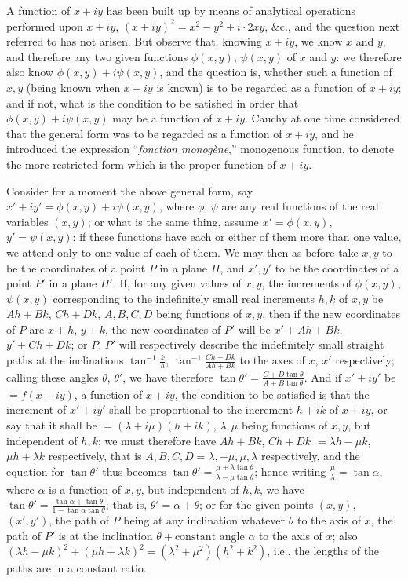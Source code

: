 \documentclass[11pt,a4paper]{book}
\begin{document}
A function of $x + iy$ has been built up by means of analytical operations performed upon $x + iy$, $(x + iy)^{2} = x^{2} - y^{2} + i \cdot 2xy$, \&c., and the question next referred to has not arisen. But observe that, knowing $x + iy$, we know $x$ and $y$, and therefore any two given functions $\phi(x, y)$, $\psi(x, y)$ of $x$ and $y$: we therefore also know $\phi(x, y) + i\psi(x, y)$, and the question is, whether such a function of $x, y$ (being known when $x + iy$ is known) is to be regarded as a function of $x + iy$; and if not, what is the condition to be satisfied in order that $\phi(x, y) + i\psi(x, y)$ may be a function of $x + iy$. Cauchy at one time considered that the general form was to be regarded as a function of $x + iy$, and he introduced the expression ``\textit{fonction monog\`{e}ne},'' monogenous function, to denote the more restricted form which is the proper function of $x + iy$.

Consider for a moment the above general form, say $x' + iy' = \phi(x, y) + i\psi(x, y)$, where $\phi$, $\psi$ are any real functions of the real variables $(x, y)$; or what is the same thing, assume $x' = \phi(x, y)$, $y' = \psi(x, y)$: if these functions have each or either of them more than one value, we attend only to one value of each of them. We may then as before take $x, y$ to be the coordinates of a point $P$ in a plane $\Pi$, and $x', y'$ to be the coordinates of a point $P'$ in a plane $\Pi'$. If, for any given values of $x, y$, the increments of $\phi(x, y)$, $\psi(x, y)$ corresponding to the indefinitely small real increments $h, k$ of $x, y$ be $Ah + Bk$, $Ch + Dk$, $A, B, C, D$ being functions of $x, y$, then if the new coordinates of $P$ are $x + h$, $y + k$, the new coordinates of $P'$ will be $x' + Ah + Bk$, $y' + Ch + Dk$; or $P$, $P'$ will respectively describe the indefinitely small straight paths at the inclinations $\tan^{-1}\frac{k}{h}$, $\tan^{-1}\frac{Ch + Dk}{Ah + Bk}$ to the axes of $x$, $x'$ respectively; calling these angles $\theta$, $\theta'$, we have therefore $\tan\theta' = \frac{C + D\tan\theta}{A + B\tan\theta}$. And if $x' + iy'$ be $= f(x + iy)$, a function of $x + iy$, the condition to be satisfied is that the increment of $x' + iy'$ shall be proportional to the increment $h + ik$ of $x + iy$, or say that it shall be $= (\lambda + i\mu)(h + ik)$, $\lambda, \mu$ being functions of $x, y$, but independent of $h, k$; we must therefore have $Ah + Bk$, $Ch + Dk$ $= \lambda h - \mu k$, $\mu h + \lambda k$ respectively, that is $A, B, C, D = \lambda, -\mu, \mu, \lambda$ respectively, and the equation for $\tan\theta'$ thus becomes $\tan\theta' = \frac{\mu + \lambda\tan\theta}{\lambda - \mu\tan\theta}$; hence writing $\frac{\mu}{\lambda} = \tan\alpha$, where $\alpha$ is a function of $x, y$, but independent of $h, k$, we have $\tan\theta' = \frac{\tan\alpha + \tan\theta}{1 - \tan\alpha\tan\theta}$; that is, $\theta' = \alpha + \theta$; or for the given points $(x, y)$, $(x', y')$, the path of $P$ being at any inclination whatever $\theta$ to the axis of $x$, the path of $P'$ is at the inclination $\theta + \text{constant angle } \alpha$ to the axis of $x$; also $(\lambda h - \mu k)^{2} + (\mu h + \lambda k)^{2} = (\lambda^{2} + \mu^{2})(h^{2} + k^{2})$, i.e., the lengths of the paths are in a constant ratio.
\end{document}
